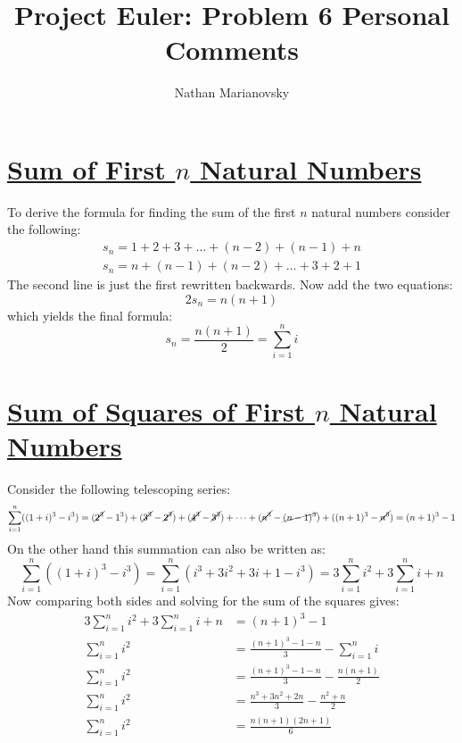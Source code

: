 \documentclass[12pt, letterpaper, onecolumn, conference, final]{IEEEtran}
\title{Project Euler: Problem 6 Personal Comments}
\author{Nathan Marianovsky}
\theoremstyle{definition}
\theoremstyle{plain}
\begin{document}
\maketitle

\section*{\underline{\Large{Sum of First $n$ Natural Numbers}}}
\vspace{.3cm}
\noindent
To derive the formula for finding the sum of the first $n$ natural numbers consider the following:
\begin{equation*}
\begin{split}
s_n = 1 + 2 + 3 + \dots + (n-2) + (n-1) + n \\
s_n = n + (n-1) + (n-2) + \dots + 3 + 2 + 1
\end{split}
\end{equation*}
The second line is just the first rewritten backwards. Now add the two equations:
\begin{equation*}
2s_n = n(n+1)
\end{equation*}
which yields the final formula:
\begin{equation*}
s_n = \frac{n(n+1)}{2} = \sum_{i=1}^n i
\end{equation*}

\vspace{.3cm}
\section*{\underline{\Large{Sum of Squares of First $n$ Natural Numbers}}}
\vspace{.3cm}
\noindent
Consider the following telescoping series:
\begin{equation*}
\sum_{i=1}^n ((1+i)^3 - i^3) = (\cancel{2^3} - 1^3) + (\cancel{3^3} - \cancel{2^3}) + (\cancel{4^3} - \cancel{3^3}) + \dots + (\cancel{n^3} - \cancel{(n-1)^3}) + ((n+1)^3 - \cancel{n^3}) = (n + 1)^3 - 1
\end{equation*}
On the other hand this summation can also be written as:
\begin{equation*}
\sum_{i=1}^n ((1+i)^3 - i^3) = \sum_{i=1}^n (i^3 + 3i^2 + 3i + 1 - i^3) = 3\sum_{i=1}^n i^2 + 3\sum_{i=1}^n i + n 
\end{equation*}
Now comparing both sides and solving for the sum of the squares gives:
\begin{equation*}
\begin{split}
3\sum_{i=1}^n i^2 + 3\sum_{i=1}^n i + n  &= (n + 1)^3 - 1 \\
\sum_{i=1}^n i^2 &= \frac{(n + 1)^3 - 1 - n}{3} - \sum_{i=1}^n i \\
\sum_{i=1}^n i^2 &= \frac{(n + 1)^3 - 1 - n}{3} - \frac{n(n + 1)}{2} \\
\sum_{i=1}^n i^2 &= \frac{n^3 + 3n^2 + 2n}{3} - \frac{n^2 + n}{2} \\
\sum_{i=1}^n i^2 &= \frac{n(n + 1)(2n + 1)}{6}
\end{split}
\end{equation*}
\end{document}
